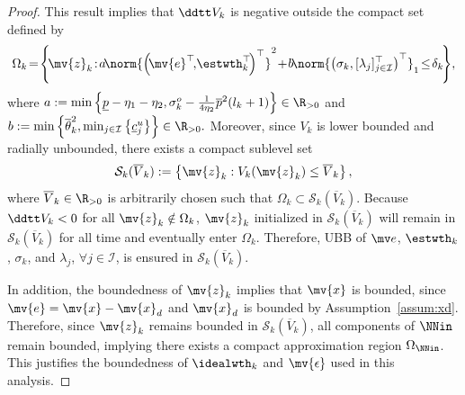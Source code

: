 \documentclass[letterpaper, journal]{IEEEtran}
\begin{document}
\begin{proof}
This result implies that $\ddtt V_{k}$ is negative outside the compact set defined by 
\begin{equation} 
  \Omega_k
  \!
  =
  \!
  \left\{
    \!
    \mv{z}_k
    \!
    :
    \!
    a
    \!
    \norm{
      \left(
        \!
        \mv{e}^\top
        \!
        ,
        \!
        \estwth_k^\top
        \!
      \right)^\top
    }^2
    \!
    +
    \!
    b
    \!
    \norm{
      \left(
        \sigma_k
        ,
        [\lambda_j]_{j\in\mathcal{I}}^\top
      \right)^\top
    }_1
    \!
    \le
    \!
    \delta_k
    \!
  \right\}
  \!
  ,
\end{equation}
where
$
    a
    :=
    \min
    \left\{
        \underline{p}
        - \eta_1
        - \eta_2
        ,
        \sigma_k^o
        -
        \tfrac{1}{4\eta_2}
        \overline{p}^2
        (l_k+1)
    \right\}
    \in\R_{>0}
$ 
and
$
    b
    :=
    \min
    \left\{
        \overline{\theta}_k^2
        ,
        \min_{j\in\mathcal{I}} 
        \left\{
            \underline{c}_j^u
        \right\}
    \right\}
    \in\R_{>0}
    .
$
Moreover, since $V_k$ is lower bounded and radially unbounded, there exists a compact sublevel set
\begin{equation} \label{eq:Sk:def}
  \mathcal S_k(\overline V_k)
  :=
  \left\{ 
    \mv{z}_k 
    : 
    V_k(\mv{z}_k)
    \le 
    \overline{V}_k 
  \right\}
  ,
\end{equation}
where $\overline{V}_k\in\R_{>0}$ is arbitrarily chosen such that $\Omega_k \subset \mathcal{S}_k(\overline{V}_k)$.
Because $\ddtt V_k<0$ for all $\mv{z}_k\notin\Omega_k$, $\mv{z}_k$ initialized in $\mathcal{S}_k(\overline{V}_k)$ will remain in $\mathcal{S}_k(\overline{V}_k)$ for all time and eventually enter $\Omega_k$.
Therefore, UBB of $\mv e$, $\estwth_k$, $\sigma_k$, and $\lambda_j$, $\forall j\in\mathcal I$, is ensured in $\mathcal{S}_k(\overline{V}_k)$.

In addition, the boundedness of $\mv{z}_k$ implies that $\mv{x}$ is bounded, since $\mv{e}=\mv{x}-\mv{x}_d$ and $\mv{x}_d$ is bounded by Assumption~\ref{assum:xd}.
Therefore, since $\mv{z}_k$ remains bounded in $\mathcal S_k(\overline{V}_k)$, all components of $\NNin$ remain bounded, implying there exists a compact approximation region $\Omega_{\NNin}$.
This justifies the boundedness of $\idealwth_k$ and $\mv{\epsilon}$ used in this analysis.


\end{proof}
\end{document}
